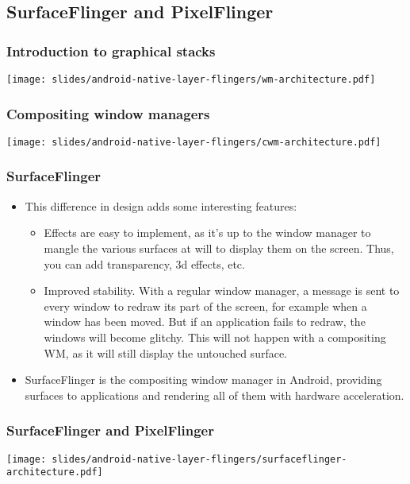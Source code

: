 \subsection{SurfaceFlinger and PixelFlinger}
\begin{frame}
  \frametitle{Introduction to graphical stacks}
  \begin{center}
    \texttt{[image: slides/android-native-layer-flingers/wm-architecture.pdf]}
  \end{center}
\end{frame}

\begin{frame}
  \frametitle{Compositing window managers}
  \begin{center}
    \texttt{[image: slides/android-native-layer-flingers/cwm-architecture.pdf]}
  \end{center}
\end{frame}

\begin{frame}
  \frametitle{SurfaceFlinger}
  \begin{itemize}
  \item This difference in design adds some interesting features:
    \begin{itemize}
    \item Effects are easy to implement, as it's up to the window
      manager to mangle the various surfaces at will to display them
      on the screen. Thus, you can add transparency, 3d effects, etc.
    \item Improved stability. With a regular window manager, a message
      is sent to every window to redraw its part of the screen, for
      example when a window has been moved. But if an application
      fails to redraw, the windows will become glitchy. This will not
      happen with a compositing WM, as it will still display the
      untouched surface.
    \end{itemize}
  \item SurfaceFlinger is the compositing window manager in Android,
    providing surfaces to applications and rendering all of them with
    hardware acceleration.
  \end{itemize}
\end{frame}

\begin{frame}
  \frametitle{SurfaceFlinger and PixelFlinger}
  \begin{center}
    \texttt{[image: slides/android-native-layer-flingers/surfaceflinger-architecture.pdf]}
  \end{center}
\end{frame}
